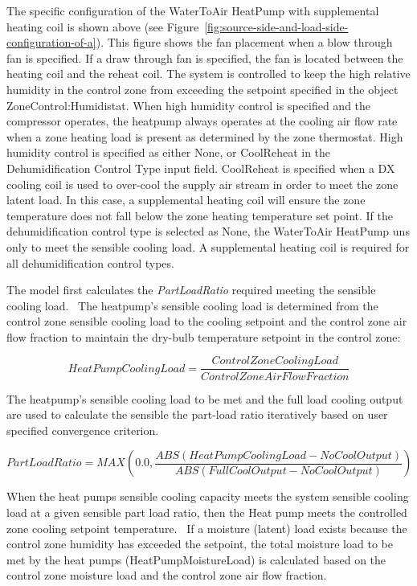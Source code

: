 The specific configuration of the WaterToAir HeatPump with supplemental heating coil is shown above (see Figure~\ref{fig:source-side-and-load-side-configuration-of-a}). This figure shows the fan placement when a blow through fan is specified. If a draw through fan is specified, the fan is located between the heating coil and the reheat coil. The system is controlled to keep the high relative humidity in the control zone from exceeding the setpoint specified in the object ZoneControl:Humidistat. When high humidity control is specified and the compressor operates, the heatpump always operates at the cooling air flow rate when a zone heating load is present as determined by the zone thermostat. High humidity control is specified as either None, or CoolReheat in the Dehumidification Control Type input field. CoolReheat is specified when a DX cooling coil is used to over-cool the supply air stream in order to meet the zone latent load. In this case, a supplemental heating coil will ensure the zone temperature does not fall below the zone heating temperature set point. If the dehumidification control type is selected as None, the WaterToAir HeatPump uns only to meet the sensible cooling load. A supplemental heating coil is required for all dehumidification control types.

The model first calculates the \emph{PartLoadRatio} required meeting the sensible cooling load.~ The heatpump's sensible cooling load is determined from the control zone sensible cooling load to the cooling setpoint and the control zone air flow fraction to maintain the dry-bulb temperature setpoint in the control zone:

\begin{equation}
HeatPumpCoolingLoad = \frac{{ControlZoneCoolingLoad}}{{ControlZoneAirFlowFraction}}
\end{equation}

The heatpump's sensible cooling load to be met and the full load cooling output are used to calculate the sensible the part-load ratio iteratively based on user specified convergence criterion.

\begin{equation}
PartLoadRatio = MAX\left( {0.0,\frac{{ABS\left( {HeatPumpCoolingLoad - NoCoolOutput} \right)}}{{ABS\left( {FullCoolOutput - NoCoolOutput} \right)}}} \right)
\end{equation}

When the heat pumps sensible cooling capacity meets the system sensible cooling load at a given sensible part load ratio, then the Heat pump meets the controlled zone cooling setpoint temperature.~ If a moisture (latent) load exists because the control zone humidity has exceeded the setpoint, the total moisture load to be met by the heat pumps (HeatPumpMoistureLoad) is calculated based on the control zone moisture load and the control zone air flow fraction.

